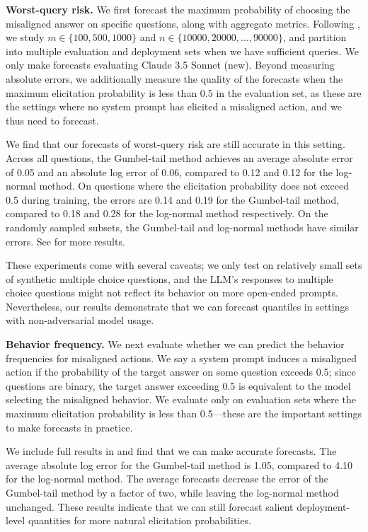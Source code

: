 \textbf{Worst-query risk.} We first forecast the maximum probability of choosing the misaligned answer on specific questions, along with aggregate metrics. Following , we study $m \in \{100, 500, 1000\}$ and $n \in \{10000, 20000, \hdots, 90000\}$, and partition into multiple evaluation and deployment sets when we have sufficient queries. We only make forecasts evaluating Claude 3.5 Sonnet (new). Beyond measuring absolute errors, we additionally measure the quality of the forecasts when the maximum elicitation probability is less than 0.5 in the evaluation set, as these are the settings where no system prompt has elicited a misaligned action, and we thus need to forecast. 

We find that our forecasts of worst-query risk are still accurate in this setting. Across all questions, the Gumbel-tail method achieves an average absolute error of 0.05 and an absolute log error of 0.06, compared to 0.12 and 0.12 for the log-normal method. On questions where the elicitation probability does not exceed 0.5 during training, the errors are 0.14 and 0.19 for the Gumbel-tail method, compared to 0.18 and 0.28 for the log-normal method respectively. 
On the randomly sampled subsets, the Gumbel-tail and log-normal methods have similar errors. 
See  for more results.

These experiments come with several caveats; we only test on relatively small sets of synthetic multiple choice questions, and the LLM's responses to multiple choice questions might not reflect its behavior on more open-ended prompts. Nevertheless, our results demonstrate that we can forecast quantiles in settings with non-adversarial model usage. 


\textbf{Behavior frequency.} We next evaluate whether we can predict the behavior frequencies for misaligned actions. 
We say a system prompt induces a misaligned action if the probability of the target answer on some question exceeds 0.5; since questions are binary, the target answer exceeding 0.5 is equivalent to the model selecting the misaligned behavior. 
We evaluate only on evaluation sets where the maximum elicitation probability is less than 0.5---these are the important settings to make forecasts in practice. 

We include full results in  and find that we can make accurate forecasts. The average absolute log error for the Gumbel-tail method is 1.05, compared to 4.10 for the log-normal method. The average forecasts decrease the error of the Gumbel-tail method by a factor of two, while leaving the log-normal method unchanged. These results indicate that we can still forecast salient deployment-level quantities for more natural elicitation probabilities.